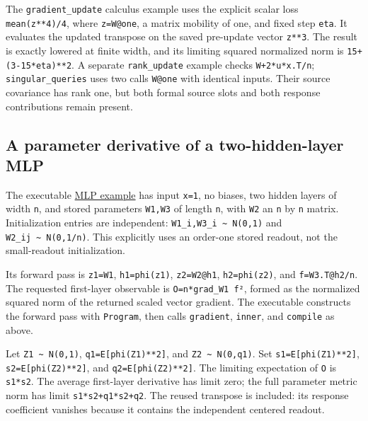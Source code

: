 \documentclass[
  11pt,
]{article}
\theoremstyle{definition}
\theoremstyle{plain}
\theoremstyle{plain}
\theoremstyle{plain}
\theoremstyle{remark}
\begin{document}
The \texttt{gradient\_update} calculus example uses the explicit scalar
loss \texttt{mean(z**4)/4}, where \texttt{z=W@one}, a matrix mobility of
one, and fixed step \texttt{eta}. It evaluates the updated transpose on
the saved pre-update vector \texttt{z**3}. The result is exactly lowered
at finite width, and its limiting squared normalized norm is
\texttt{15+(3-15*eta)**2}. A separate \texttt{rank\_update} example
checks \texttt{W+2*u*x.T/n}; \texttt{singular\_queries} uses two calls
\texttt{W@one} with identical inputs. Their source covariance has rank
one, but both formal source slots and both response contributions remain
present.

\subsection{A parameter derivative of a two-hidden-layer
MLP}\label{a-parameter-derivative-of-a-two-hidden-layer-mlp}

The executable \href{code/scripts/example_mfp_mlp_derivative.py}{MLP
example} has input \texttt{x=1}, no biases, two hidden layers of width
\texttt{n}, and stored parameters \texttt{W1,W3} of length \texttt{n},
with \texttt{W2} an \texttt{n} by \texttt{n} matrix. Initialization
entries are independent: \texttt{W1\_i,W3\_i\ \textasciitilde{}\ N(0,1)}
and \texttt{W2\_ij\ \textasciitilde{}\ N(0,1/n)}. This explicitly uses
an order-one stored readout, not the small-readout initialization.

Its forward pass is \texttt{z1=W1}, \texttt{h1=phi(z1)},
\texttt{z2=W2@h1}, \texttt{h2=phi(z2)}, and \texttt{f=W3.T@h2/n}. The
requested first-layer observable is
\texttt{O=n*\textbar{}\textbar{}grad\_W1\ f\textbar{}\textbar{}²},
formed as the normalized squared norm of the returned scaled vector
gradient. The executable constructs the forward pass with
\texttt{Program}, then calls \texttt{gradient}, \texttt{inner}, and
\texttt{compile} as above.

Let \texttt{Z1\ \textasciitilde{}\ N(0,1)},
\texttt{q1=E{[}phi(Z1)**2{]}}, and
\texttt{Z2\ \textasciitilde{}\ N(0,q1)}. Set
\texttt{s1=E{[}phi\textquotesingle{}(Z1)**2{]}},
\texttt{s2=E{[}phi\textquotesingle{}(Z2)**2{]}}, and
\texttt{q2=E{[}phi(Z2)**2{]}}. The limiting expectation of \texttt{O} is
\texttt{s1*s2}. The average first-layer derivative has limit zero; the
full parameter metric norm has limit \texttt{s1*s2+q1*s2+q2}. The reused
transpose is included: its response coefficient vanishes because it
contains the independent centered readout.
\end{document}
